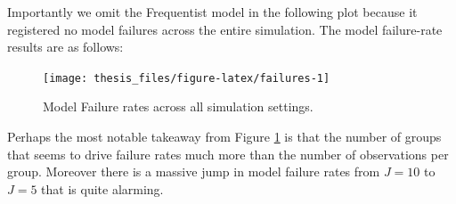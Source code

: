 \documentclass[12pt,twoside]{reedthesis}
\begin{document}
Importantly we omit the Frequentist model in the following plot because it registered no model failures across the entire simulation. The model failure-rate results are as follows:
\begin{figure}

{\centering \texttt{[image: thesis\_files/figure-latex/failures-1]} 

}

\caption{Model Failure rates across all simulation settings.}\label{fig:failures}
\end{figure}
Perhaps the most notable takeaway from Figure \ref{fig:failures} is that the number of groups that seems to drive failure rates much more than the number of observations per group. Moreover there is a massive jump in model failure rates from \(J = 10\) to \(J = 5\) that is quite alarming.
\end{document}
